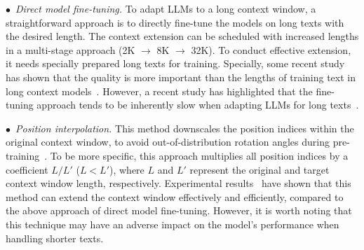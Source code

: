 {{

{
$\bullet$~\emph{Direct model fine-tuning.} 
To adapt LLMs to a long context window, a straightforward approach is to directly fine-tune the models on long texts with the desired length. 
The context extension can be scheduled with increased lengths in a multi-stage approach (\eg 2K $\rightarrow$ 8K $\rightarrow$ 32K). 
To conduct effective extension, it needs specially prepared long texts for training. 
Specially, some recent study has shown that the quality is more important than the lengths of training text in long context models~\cite{xiong-arxiv-2023-effective}. However, a recent study has highlighted that
the fine-tuning approach tends to be inherently slow when adapting LLMs for long texts~\cite{Chen-arxiv-2023-Extending}.
}


$\bullet$~\emph{Position interpolation.} This method downscales the position indices within the original context window, to avoid out-of-distribution rotation angles during  pre-training~\cite{Chen-arxiv-2023-Extending, kaiokendev-github-2023-Things}. To be more specific, this approach multiplies all position indices by a coefficient $L/L'$ ($L < L'$), where $L$ and $L'$ represent the original and target context window length, respectively. {
Experimental results~\cite{Chen-arxiv-2023-Extending} have shown that this method can extend the context window effectively and efficiently},  compared to the above approach of direct model fine-tuning. However, it is worth noting that this technique may have an adverse impact on the model's performance when handling shorter texts\cite{Chen-arxiv-2023-Extending,Dong-arxiv-2023-BAMBOO}.}





}
